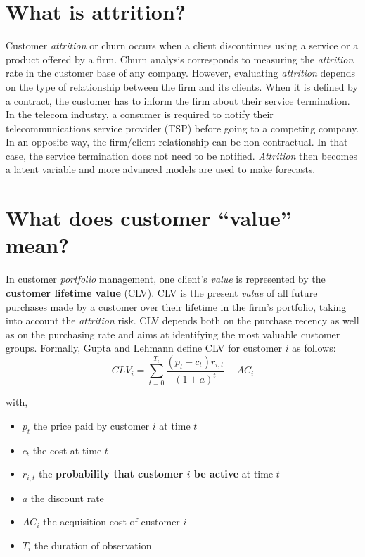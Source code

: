\documentclass[
]{book}
\providecommand{\tightlist}{%
  \setlength{\itemsep}{0pt}\setlength{\parskip}{0pt}}
\begin{document}
\hypertarget{attritiondef}{%
\section{What is attrition?}\label{attritiondef}}

Customer \emph{attrition} or churn occurs when a client discontinues using a service or a product offered by a firm. Churn analysis corresponds to measuring the \emph{attrition} rate in the customer base of any company. However, evaluating \emph{attrition} depends on the type of relationship between the firm and its clients. When it is defined by a contract, the customer has to inform the firm about their service termination. In the telecom industry, a consumer is required to notify their telecommunications service provider (TSP) before going to a competing company. In an opposite way, the firm/client relationship can be non-contractual. In that case, the service termination does not need to be notified. \emph{Attrition} then becomes a latent variable and more advanced models are used to make forecasts.

\hypertarget{valuedef}{%
\section{What does customer ``value'' mean?}\label{valuedef}}

In customer \emph{portfolio} management, one client's \emph{value} is represented by the \textbf{customer lifetime value} (CLV). CLV is the present \emph{value} of all future purchases made by a customer over their lifetime in the firm's portfolio, taking into account the \emph{attrition} risk. CLV depends both on the purchase recency as well as on the purchasing rate and aims at identifying the most valuable customer groups. Formally, Gupta and Lehmann \citep{CUSTOMERS_ASSETS} define CLV for customer \(i\) as follows:
\[CLV_i = \sum_{t=0}^{T_i} \frac{(p_t - c_t)r_{i,t}}{(1+a)^t} - AC_i\]

with,

\begin{itemize}
\tightlist
\item
  \(p_t\) the price paid by customer \(i\) at time \(t\)
\item
  \(c_t\) the cost at time \(t\)
\item
  \(r_{i,t}\) the \textbf{probability that customer \(i\) be active} at time \(t\)
\item
  \(a\) the discount rate
\item
  \(AC_i\) the acquisition cost of customer \(i\)
\item
  \(T_i\) the duration of observation
\end{itemize}
\end{document}
